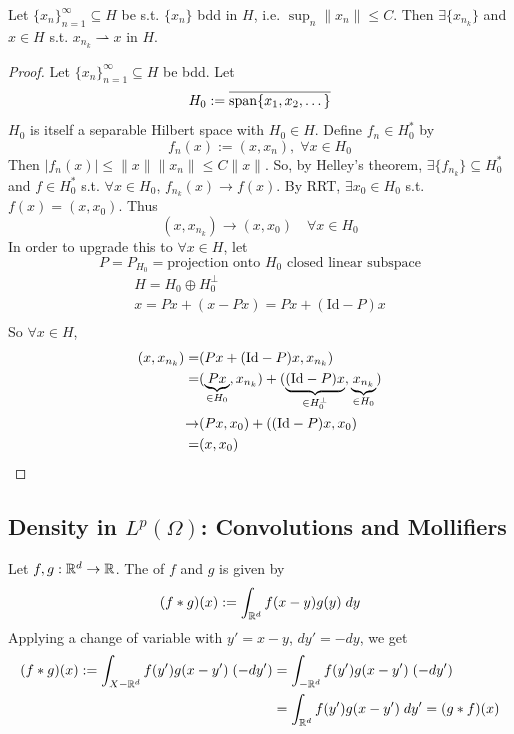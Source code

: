 \begin{thm}
    Let $\{x_{n}\}_{n=1}^{\infty} \subseteq H$ be s.t. $\{ x_n \}$ bdd in $H$, i.e. $\sup_{n} \| x_n \| \leq C $.
    Then $\exists \{x_{n_k}\}$ and $x \in H$ s.t. $x_{n_k} \rightharpoonup x$ in $H$.        
\end{thm}
\begin{proof}
    Let $\{x_{n}\}_{n=1}^{\infty} \subseteq H$ be bdd. Let 
    \[
        H_0 := \overline{\operatorname{span} \{ x_1, x_2, \dots \}}
    \]  
    $H_0$ is itself a separable Hilbert space with $H_0 \in H$. Define $f_n \in H_0^*$ by
    \[
    f_n(x) := (x, x_n), \; \forall x \in H_0
    \]
    Then $|f_n(x)| \leq \| x \| \| x_n \| \leq C \| x \|$. So, by Helley's theorem, $\exists 
    \{f_{n_k}\} \subseteq H_0^*$ and $f \in H_0^*$ s.t. $\forall x \in H_0$,
    $f_{n_k}(x) \to f(x)$. By RRT, $\exists x_0 \in H_0$ s.t. $f(x) = (x, x_0)$.  
    Thus 
    \[
        (x, x_{n_k}) \to (x, x_0) \quad \forall x \in H_0
    \] 
    In order to upgrade this to $\forall x \in H$, let
    \[
        P = P_{H_0} = \text{projection onto } H_0 \text{ closed linear subspace}
    \]   
    \begin{align*}
        H = H_0 \oplus H_0^\perp \\
        x = P x + (x - P x) = P x + (\text{Id} - P) x \\
    \end{align*}
    So $\forall x \in H$,
    \begin{align*}
        (x, x_{n_k}) =& (P x + (\text{Id} - P) x, x_{n_k}) \\
        =& (\underbrace{P x}_{\in H_0}, x_{n_k}) + (\underbrace{(\text{Id} - P ) x}_{\in H_0^\perp}, \underbrace{x_{n_k}}_{\in H_0}) \\
        \to& (P x, x_0) + ((\text{Id} - P) x, x_0) \\
        =& (x, x_0) \qedhere
    \end{align*} 
\end{proof}

\subsection{Density in $L^p(\Omega)$: Convolutions and Mollifiers}

\begin{defn}[convolution]
    Let $f, g : \mathbb{R}^d \to \mathbb{R}$. The  of $f$ and $g$ is given by
    \[
        (f * g)(x) := \int_{\mathbb{R}^d} f(x-y) g(y) \; dy
    \]  
    Applying a change of variable with $y' = x- y$, $dy' = -dy$, we get
    \begin{align*}
        (f * g)(x) := \int_{X - \mathbb{R}^d} f(y') g(x - y') \; (-dy') &= \int_{-\mathbb{R}^d} f(y') g(x - y') \; (-dy') \\
        &= \int_{\mathbb{R}^d} f(y') g(x - y') \; dy' = (g * f)(x)
    \end{align*}  
\end{defn}

